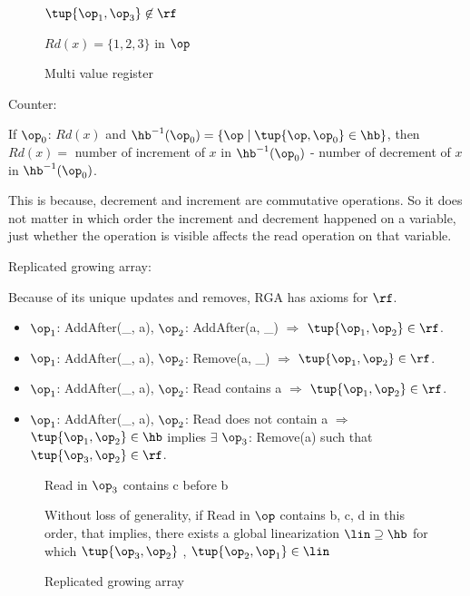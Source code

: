 \begin{figure}[H]
  \centering
  \begin{minipage}{.45\textwidth}
    
    \caption{$\tup{\op_1, \op_3} \not\in \rf$}
    \label{mvreg:a}
  \end{minipage}
  \begin{minipage}{.45\textwidth}
    
    \caption{$Rd(x) = \{1,2,3\}$ in $\op$}
    \label{mvreg:b}
  \end{minipage}
  \caption{Multi value register}
\end{figure}

Counter:

If $\op_0$: $Rd(x)$ and $\hb^{-1}(\op_0) = \{\op \mid \tup{\op, \op_0} \in \hb\}$, then $Rd(x) = $ number of increment of $x$ in $\hb^{-1}(\op_0)$ - number of decrement of $x$ in $\hb^{-1}(\op_0)$.

This is because, decrement and increment are commutative operations. So it does not matter in which order the increment and decrement happened on a variable, just whether the operation is visible affects the read operation on that variable.

Replicated growing array:

Because of its unique updates and removes, RGA has axioms for $\rf$.

\begin{itemize}
 \item $\op_1$: AddAfter(\_, a), $\op_2$: AddAfter(a, \_) $\Rightarrow$ $\tup{\op_1, \op_2} \in \rf$.
 \item $\op_1$: AddAfter(\_, a), $\op_2$: Remove(a, \_) $\Rightarrow$ $\tup{\op_1, \op_2} \in \rf$.
 \item $\op_1$: AddAfter(\_, a), $\op_2$: Read contains a $\Rightarrow$ $\tup{\op_1, \op_2} \in \rf$.
 \item $\op_1$: AddAfter(\_, a), $\op_2$: Read does not contain a $\Rightarrow$ $\tup{\op_1, \op_2} \in \hb$ implies $\exists$ $\op_3$: Remove(a) such that $\tup{\op_3, \op_2} \in \rf$.
\end{itemize}



\begin{figure}[ht]
  \centering
  \begin{minipage}{.45\textwidth}
    
    \caption{Read in $\op_3$ contains c before b}
    \label{rga:a}
  \end{minipage}
  \begin{minipage}{.45\textwidth}
    
    \caption{Without loss of generality, if Read in $\op$ contains b, c, d in this order, that implies, there exists a global linearization $\lin \supseteq \hb$ for which $\tup{\op_3, \op_2}$ , $\tup{\op_2, \op_1} \in \lin$ }
    \label{rga:b}
  \end{minipage}
  \caption{Replicated growing array}
\end{figure}

